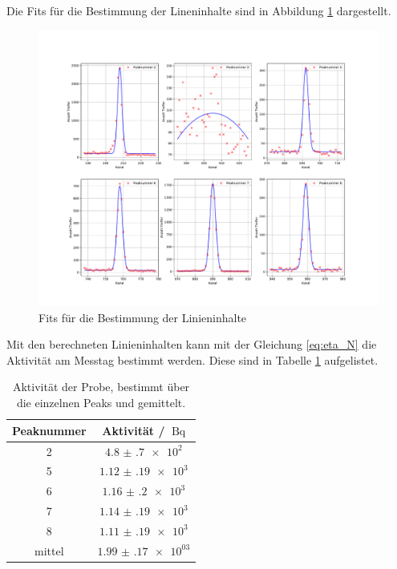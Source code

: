 \FloatBarrier
Die Fits für die Bestimmung der Lineninhalte sind in Abbildung \ref{fig:Linieninhalt_03} dargestellt.
\FloatBarrier
\begin{figure}
  \centering
  \includegraphics[width=\textwidth,keepaspectratio]{figure/03_subplot.pdf}
  \caption{Fits für die Bestimmung der Linieninhalte}
  \label{fig:Linieninhalt_03}
\end{figure}
Mit den berechneten Linieninhalten kann mit der Gleichung \eqref{eq:eta_N} die Aktivität am Messtag bestimmt werden. 
Diese sind in Tabelle \ref{tab:Akti_03} aufgelistet.
\FloatBarrier
\begin{table}
  \centering
  \caption{Aktivität der  Probe, bestimmt über die einzelnen Peaks und gemittelt.}
  \label{tab:Akti_03}
  \begin{tabular}{c c}
    \toprule
    Peaknummer & Aktivität / $\SI{}{\becquerel}$\\
    \midrule
    2&$\num{4.8(7)e+2}$\\
    5&$\num{1.12(19)e+3}$\\
    6&$\num{1.16(20)e+3}$\\
    7&$\num{1.14(19)e+3}$\\
    8&$\num{1.11(19)e+3}$\\
    \midrule
    mittel& $\num{1.99(17)e+03}$\\
    \bottomrule
  \end{tabular}
\end{table}
